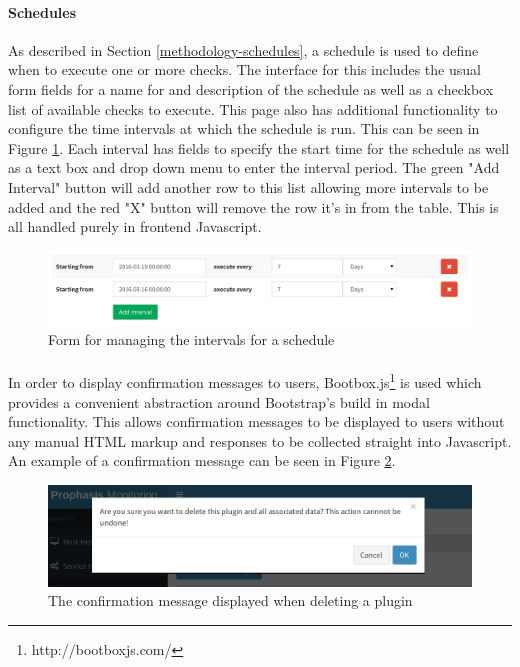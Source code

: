 \documentclass[bsc,logo,twoside,singlespacing,notimes]{infthesis}
\begin{document}
\paragraph*{Schedules}
	As described in Section \ref{methodology-schedules}, a schedule is used to
	define when to execute one or more checks.  The interface for this includes the
	usual form fields for a name for and description of the schedule as well as a
	checkbox list of available checks to execute.  This page also has additional
	functionality to configure the time intervals at which the schedule is run. This
	can be seen in Figure \ref{schedule-intervals}.  Each interval has fields to
	specify the start time for the schedule as well as a text box and drop down menu
	to enter the interval period.  The green "Add Interval" button will add another
	row to this list allowing more intervals to be added and the red "X" button will
	remove the row it's in from the table.  This is all handled purely in frontend
	Javascript.
	
\begin{figure}[H]
	\caption{Form for managing the intervals for a schedule}
	\label{schedule-intervals}
	\includegraphics[scale=0.54]{assets/screenshots/schedule-intervals.pdf}
\end{figure}

\paragraph*{}
	In order to display confirmation messages to users,
	Bootbox.js\footnote{http://bootboxjs.com/} is used which provides a convenient
	abstraction around Bootstrap's build in modal functionality.  This allows
	confirmation messages to be displayed to users without any manual HTML markup
	and responses to be collected straight into Javascript.  An example of a
	confirmation message can be seen in Figure \ref{bootbox-delete}.

\begin{figure}[H]
	\centering
	\caption{The confirmation message displayed when deleting a plugin}
	\label{bootbox-delete}
	\includegraphics[scale=0.6]{assets/screenshots/bootbox-delete.pdf}
\end{figure}
\end{document}
